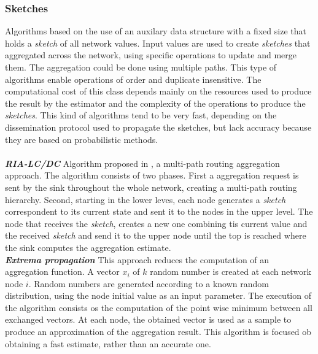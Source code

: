 \subsubsection{Sketches}
Algorithms based on the use of an auxilary data structure with a fixed size that holds a \textit{sketch} of all network values. Input values are used to create \textit{sketches} that aggregated across the network, using specific operations to update and merge them. The aggregation could be done using multiple paths. This type of algorithms enable operations of order and duplicate insensitive. The computational cost of this class depends mainly on the resources used to produce the result by the estimator and the complexity of the operations to produce the \textit{sketches}. This kind of algorithms tend to be very fast, depending on the dissemination protocol used to propagate the sketches, but lack accuracy because they are based on probabilistic methods.\\
\\
\textbf{\textit{RIA-LC/DC}} Algorithm proposed in \cite{fan2008efficient}, a multi-path routing aggregation approach. The algorithm consists of two phases. First a aggregation request is sent by the sink throughout the whole network, creating a multi-path routing hierarchy. Second, starting in the lower leves, each node generates a \textit{sketch} correspondent to its current state and sent it to the nodes in the upper level. The node that receives the \textit{sketch}, creates a new one combining tis current value and the received \textit{sketch} and send it to the upper node until the top is reached where the sink computes the aggregation estimate.
\\
\textbf{\textit{Extrema propagation}}
This approach reduces the computation of an aggregation function\cite{journals/corr/abs-1110-0725}. A vector $x_i$ of $k$ random number is created at each network node $i$. Random numbers are generated according to a known random distribution, using the node initial value as an input parameter. The execution of the algorithm consists os the computation of the point wise minimum between all exchanged vectors. At each node, the obtained vector is used as a sample to produce an approximation of the aggregation result. This algorithm is focused ob obtaining a fast estimate, rather than an accurate one. 
